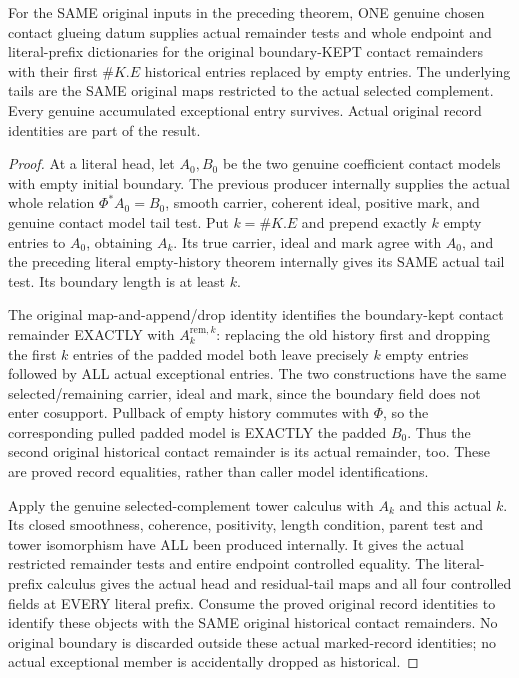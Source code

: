 \begin{theorem}
\label{hir:zero-contact-tail-original-history}
\leanok
{}
For the SAME original inputs in the preceding theorem, ONE genuine chosen
contact glueing datum supplies actual remainder tests and whole endpoint
and literal-prefix dictionaries for the original boundary-KEPT contact
remainders with their first $\#K.E$ historical entries replaced by empty
entries. The underlying tails are the SAME original maps restricted to
the actual selected complement. Every genuine accumulated exceptional
entry survives. Actual original record identities are part of the result.
\end{theorem}
\begin{proof}
At a literal head, let $A_0,B_0$ be the two genuine coefficient contact
models with empty initial boundary. The previous producer internally
supplies the actual whole relation $\Phi^*A_0=B_0$, smooth carrier,
coherent ideal, positive mark, and genuine contact model tail test.
Put $k=\#K.E$ and prepend exactly $k$ empty entries to $A_0$, obtaining
$A_k$. Its true carrier, ideal and mark agree with $A_0$, and the preceding
literal empty-history theorem internally gives its SAME actual tail test.
Its boundary length is at least $k$.

The original map-and-append/drop identity identifies the boundary-kept
contact remainder EXACTLY with $A_k^{\mathrm{rem},k}$: replacing the old
history first and dropping the first $k$ entries of the padded model both
leave precisely $k$ empty entries followed by ALL actual exceptional
entries. The two constructions have the same selected/remaining carrier,
ideal and mark, since the boundary field does not enter cosupport. Pullback
of empty history commutes with $\Phi$, so the corresponding pulled padded
model is EXACTLY the padded $B_0$. Thus the second original historical
contact remainder is its actual remainder, too. These are proved record
equalities, rather than caller model identifications.

Apply the genuine selected-complement tower calculus with $A_k$ and this
actual $k$. Its closed smoothness, coherence, positivity, length condition,
parent test and tower isomorphism have ALL been produced internally.
It gives the actual restricted remainder tests and entire endpoint
controlled equality. The literal-prefix calculus gives the actual head
and residual-tail maps and all four controlled fields at EVERY literal
prefix. Consume the proved original record identities to identify these
objects with the SAME original historical contact remainders. No original
boundary is discarded outside these actual marked-record identities;
no actual exceptional member is accidentally dropped as historical.
\end{proof}

